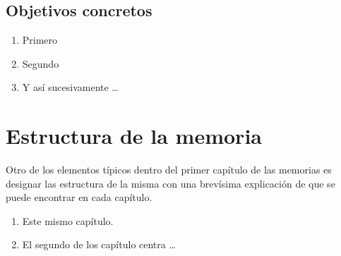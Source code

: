 \subsection{Objetivos concretos}
\begin{enumerate}[label={\textbf{Objetivo Concreto \arabic*:}},leftmargin=4.5cm,labelindent=\parindent]
    \item Primero
    \item Segundo 
    \item Y así sucesivamente \ldots
\end{enumerate}


\section{Estructura de la memoria}
Otro de los elementos típicos dentro del primer capítulo de las memorias es designar las estructura de la misma con una brevísima  explicación de que se puede encontrar en cada capítulo.

\begin{enumerate}[label={Capítulo \arabic*},leftmargin=2.5cm]
\item Este mismo capítulo.
\item El segundo de los capítulo centra \ldots
\end{enumerate}

